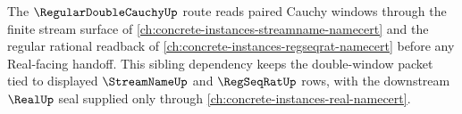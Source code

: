 The $\RegularDoubleCauchyUp$ route reads paired Cauchy windows through the finite stream surface of \autoref{ch:concrete-instances-streamname-namecert} and the regular rational readback of \autoref{ch:concrete-instances-regseqrat-namecert} before any Real-facing handoff. This sibling dependency keeps the double-window packet tied to displayed $\StreamNameUp$ and $\RegSeqRatUp$ rows, with the downstream $\RealUp$ seal supplied only through \autoref{ch:concrete-instances-real-namecert}.
